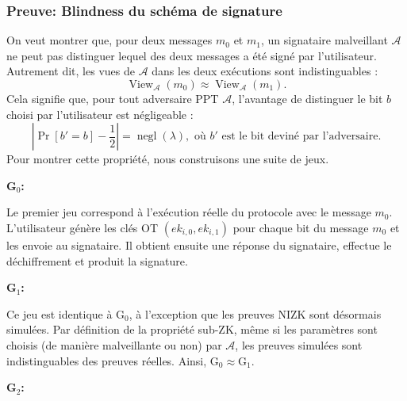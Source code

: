 \subsubsection{Preuve: Blindness du schéma de signature}
On veut montrer que, pour deux messages $m_0$ et $m_1$, un signataire malveillant $\mathcal{A}$ ne peut pas distinguer lequel des deux messages a été signé par l'utilisateur. Autrement dit, les vues de $\mathcal{A}$ dans les deux exécutions sont indistinguables :
\[
\operatorname{View}_{\mathcal{A}}(m_0) \approx \operatorname{View}_{\mathcal{A}}(m_1).
\]
Cela signifie que, pour tout adversaire PPT $\mathcal{A}$, l'avantage de distinguer le bit $b$ choisi par l'utilisateur est négligeable :
\[
\left|\Pr[b'=b]-\frac{1}{2}\right|=\operatorname{negl}(\lambda), \text{ où $b'$ est le bit deviné par l'adversaire.}
\]
Pour montrer cette propriété, nous construisons une suite de jeux.

\bigskip

\noindent\textbf{G$_0$:}

Le premier jeu correspond à l'exécution réelle du protocole avec le message $m_0$. L'utilisateur génère les clés OT $(ek_{i,0}, ek_{i,1})$ pour chaque bit du message $m_0$ et les envoie au signataire. Il obtient ensuite une réponse du signataire, effectue le déchiffrement et produit la signature.


\noindent\textbf{G$_1$:}

Ce jeu est identique à G$_0$, à l'exception que les preuves NIZK sont désormais simulées. Par définition de la propriété sub-ZK, même si les paramètres sont choisis (de manière malveillante ou non) par $\mathcal{A}$, les preuves simulées sont indistinguables des preuves réelles. Ainsi,
$\text{G}_0 \approx \text{G}_1$.


\noindent\textbf{G$_2$:}

